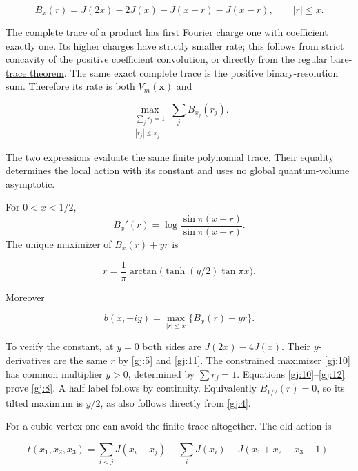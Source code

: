 \begin{equation}\label{gj:9}
B_x(r)=J(2x)-2J(x)-J(x+r)-J(x-r),\qquad |r|\le x.
\end{equation}

The complete trace of a product has first Fourier charge one with coefficient exactly one. Its higher charges have strictly smaller rate; this follows from strict concavity of the positive coefficient convolution, or directly from the \href{https://sashakolpakov.github.io/murakamis_dream/notes/actual_main_meridian_regular_bare_trace.html}{regular bare-trace theorem}. The same exact complete trace is the positive binary-resolution sum. Therefore its rate is both \(V_m(\mathbf x)\) and

\begin{equation}\label{gj:10}
\max_{\substack{\sum_jr_j=1\\ |r_j|\le x_j}}
                               \sum_jB_{x_j}(r_j).
\end{equation}

The two expressions evaluate the same finite polynomial trace. Their
equality determines the local action with its constant and uses no
global quantum-volume asymptotic.

For \(0<x<1/2\),
\[
 B_x'(r)=\log\frac{\sin\pi(x-r)}{\sin\pi(x+r)}.
\]
The unique maximizer of \(B_x(r)+yr\) is

\begin{equation}\label{gj:11}
r=\frac1\pi\arctan\bigl(\tanh(y/2)\tan\pi x\bigr).
\end{equation}

Moreover

\begin{equation}\label{gj:12}
b(x,-iy)=\max_{|r|\le x}\{B_x(r)+yr\}.
\end{equation}

To verify the constant, at \(y=0\) both sides are
\(J(2x)-4J(x)\). Their \(y\)-derivatives are the same \(r\) by \eqref{gj:5} and \eqref{gj:11}. The constrained maximizer \eqref{gj:10} has common multiplier \(y>0\), determined by \(\sum r_j=1\). Equations \eqref{gj:10}--\eqref{gj:12} prove \eqref{gj:8}. A half label follows by continuity. Equivalently \(B_{1/2}(r)=0\), so its tilted maximum is \(y/2\), as also follows directly from \eqref{gj:4}.

For a cubic vertex one can avoid the finite trace altogether. The old action is

\begin{equation}\label{gj:13}
t(x_1,x_2,x_3)=
 \sum_{i<j}J(x_i+x_j)-\sum_iJ(x_i)-J(x_1+x_2+x_3-1).
\end{equation}

